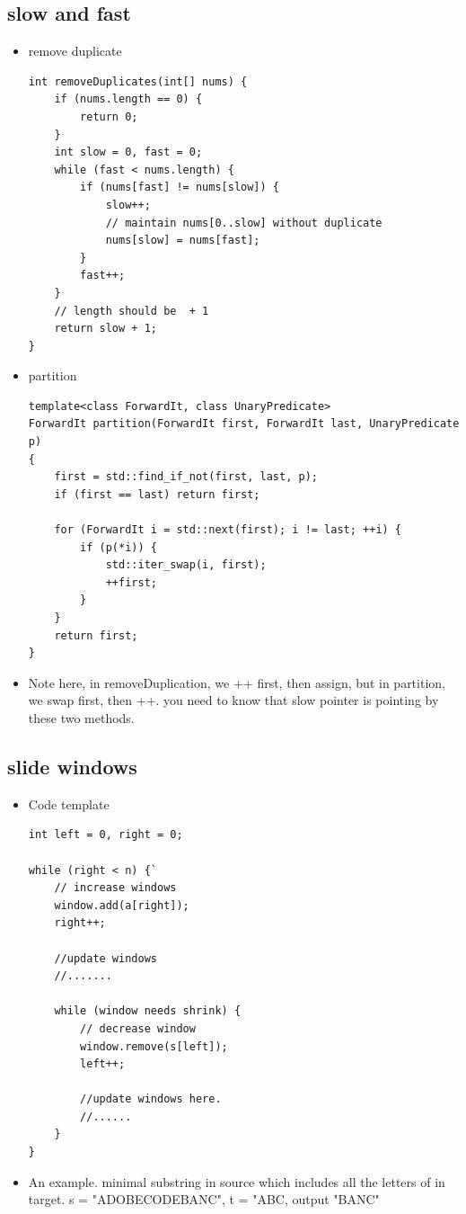 \documentclass[a4paper,11pt,twoside]{book}
\begin{document}
\subsection{slow and fast}
\begin{itemize}
	\item remove duplicate
\begin{lstlisting}[breaklines]
int removeDuplicates(int[] nums) {
	if (nums.length == 0) {
		return 0;
	}
	int slow = 0, fast = 0;
	while (fast < nums.length) {
		if (nums[fast] != nums[slow]) {
			slow++;
			// maintain nums[0..slow] without duplicate
			nums[slow] = nums[fast];
		}
		fast++;
	}
	// length should be  + 1
	return slow + 1;
}
\end{lstlisting}

	\item partition
\begin{lstlisting}[breaklines]
template<class ForwardIt, class UnaryPredicate>
ForwardIt partition(ForwardIt first, ForwardIt last, UnaryPredicate p)
{
	first = std::find_if_not(first, last, p);
	if (first == last) return first;
	
	for (ForwardIt i = std::next(first); i != last; ++i) {
		if (p(*i)) {
			std::iter_swap(i, first);
			++first;
		}
	}
	return first;
}
\end{lstlisting}

\item Note here, in removeDuplication, we ++ first, then assign, but in partition, we swap first, then ++. you need to know that slow pointer is pointing by these two methods. 

	
\end{itemize}
\subsection{slide windows}
\begin{itemize}
	\item Code template
\begin{lstlisting}[breaklines]
int left = 0, right = 0;

while (right < n) {`
	// increase windows
	window.add(a[right]);
	right++;
	
	//update windows
	//.......
	
	while (window needs shrink) {
		// decrease window
		window.remove(s[left]);
		left++;
		
		//update windows here.
		//......
	}
}			
\end{lstlisting}

	\item An example. minimal substring in source which includes all the letters of in target.
	s = "ADOBECODEBANC", t = "ABC, output "BANC"
	
\end{itemize}
\end{document}
